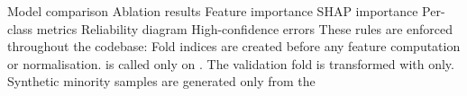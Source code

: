 {}\markdownRendererPipe{} Model comparison \markdownRendererPipe{}  \markdownRendererPipe{}\markdownRendererSoftLineBreak
{}\markdownRendererPipe{} Ablation results \markdownRendererPipe{}  \markdownRendererPipe{}\markdownRendererSoftLineBreak
{}\markdownRendererPipe{} Feature importance \markdownRendererPipe{}  \markdownRendererPipe{}\markdownRendererSoftLineBreak
{}\markdownRendererPipe{} SHAP importance \markdownRendererPipe{}  \markdownRendererPipe{}\markdownRendererSoftLineBreak
{}\markdownRendererPipe{} Per-class metrics \markdownRendererPipe{}  \markdownRendererPipe{}\markdownRendererSoftLineBreak
{}\markdownRendererPipe{} Reliability diagram \markdownRendererPipe{}  \markdownRendererPipe{}\markdownRendererSoftLineBreak
{}\markdownRendererPipe{} High-confidence errors \markdownRendererPipe{}  \markdownRendererPipe{}\markdownRendererInterblockSeparator
{}\markdownRendererThematicBreak{}\markdownRendererInterblockSeparator
{}
\markdownRendererSectionEnd 
\markdownRendererSectionEnd \markdownRendererSectionBegin
{}\markdownRendererInterblockSeparator
{}These rules are enforced throughout the codebase:\markdownRendererInterblockSeparator
{}\markdownRendererOlBegin
{} Fold indices are created before any feature computation or\markdownRendererSoftLineBreak
{}normalisation.\markdownRendererOlItemEnd 
{}  is called only on .\markdownRendererSoftLineBreak
{}The validation fold is transformed with  only.\markdownRendererOlItemEnd 
{} Synthetic minority samples are generated only from the\markdownRendererSoftLineBreak
